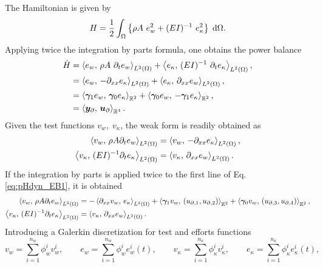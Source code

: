 The Hamiltonian is given by 
\begin{equation}
H = \energy{\rho A \ e_w^2 + (EI)^{-1}\ e_\kappa^2}.
\end{equation}
Applying twice the integration by parts formula, one obtains the power balance
\begin{equation}
\begin{aligned}
\dot{H} &= \inner[L^2(\Omega)]{e_w}{\rho A \ \partial_{t} e_w} + \inner[L^2(\Omega)]{e_\kappa}{(E I)^{-1} \ \partial_{t} e_\kappa}, \\
&=\inner[L^2(\Omega)]{e_w}{-\partial_{xx} e_\kappa} + \inner[L^2(\Omega)]{e_\kappa}{\partial_{xx} e_w}, \\
&=\inner[\mathbb{R}^2]{\bm\gamma_{1} e_w}{\bm\gamma_{0} e_\kappa} + \inner[\mathbb{R}^2]{\bm\gamma_{0} e_w}{-\bm\gamma_{1} e_\kappa}, \\
&= \inner[\mathbb{R}^4]{\bm{y}_\partial}{\bm{u}_\partial}.
\end{aligned}
\end{equation}
Given the test functions $v_w, \; v_\kappa$, the weak form is readily obtained as 
\begin{equation}\label{eq:weak_EB}
\begin{aligned}
\inner[L^2(\Omega)]{v_w}{\rho A \partial_t e_w} &= \inner[L^2(\Omega)]{v_w}{-\partial_{xx} e_\kappa}, \\
\inner[L^2(\Omega)]{v_\kappa}{(EI)^{-1} \partial_t e_\kappa} &= \inner[L^2(\Omega)]{v_\kappa}{\partial_{xx} e_w}. \\
\end{aligned}
\end{equation}
If the integration by parts is applied twice to the first line of Eq. \eqref{eq:pHdyn_EB1}, it is obtained
\begin{equation}\label{eq:weak_EB_Hess}
\begin{aligned}
\inner[L^2(\Omega)]{v_w}{\rho A \partial_t e_w} &= -\inner[L^2(\Omega)]{\partial_{xx} v_w}{e_\kappa} + \inner[\mathbb{R}^2]{\bm\gamma_1 v_w}{({u}_{\partial, 1}, {u}_{\partial, 2})} + \inner[\mathbb{R}^2]{\bm\gamma_0 v_w}{({u}_{\partial, 3}, {u}_{\partial, 4})}, \\
\inner[L^2(\Omega)]{v_\kappa}{(EI)^{-1} \partial_t e_\kappa} &= \inner[L^2(\Omega)]{v_\kappa}{\partial_{xx} e_w}. \\
\end{aligned}
\end{equation}
Introducing a Galerkin discretization for test and efforts functions
\begin{equation}
v_w = \sum_{i = 1}^{n_w} \phi_w^i v_w^i, \qquad e_w = \sum_{i = 1}^{n_w} \phi_w^i e_w^i(t),
\qquad v_\kappa = \sum_{i = 1}^{n_\kappa} \phi_\kappa^i v_\kappa^i, \qquad e_\kappa = \sum_{i = 1}^{n_\kappa} \phi_\kappa^i e_\kappa^i(t),
\end{equation} 
